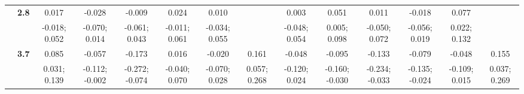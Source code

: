 \begin{landscape}
\begin{table}[!htp]
\begin{center}
\begin{tabular}{>{\bfseries}c>{\bfseries}ccccccccccccc}
 & 2.8 & 0.017 & -0.028 & -0.009 & 0.024 & 0.010 &  & 0.003 & 0.051 & 0.011 & -0.018 & 0.077 & \\
 &  & -0.018; 0.052 & -0.070; 0.014 & -0.061; 0.043 & -0.011; 0.061 & -0.034; 0.055 &  & -0.048; 0.054 & 0.005; 0.098 & -0.050; 0.072 & -0.056; 0.019 & 0.022; 0.132 & \\[0.7ex]
 & 3.7 & 0.085 & -0.057 & -0.173 & 0.016 & -0.020 & 0.161 & -0.048 & -0.095 & -0.133 & -0.079 & -0.048 & 0.155\\
 &  & 0.031; 0.139 & -0.112; -0.002 & -0.272; -0.074 & -0.040; 0.070 & -0.070; 0.028 & 0.057; 0.268 & -0.120; 0.024 & -0.160; -0.030 & -0.234; -0.033 & -0.135; -0.024 & -0.109; 0.015 & 0.037; 0.269\\
\bottomrule
\end{tabular}
\end{center}
\end{table}
\end{landscape}

